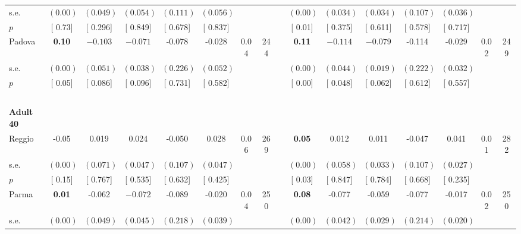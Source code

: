 \begin{longtable}{L{8em} c c c c c c c p{1em} c c c c c c c}
\quad \quad \quad \quad s.e.& $ (     0.00)$ & $ (    0.049)$ & $ (    0.054)$ & $ (    0.111)$ & $ (    0.056)$ & & & & $ (     0.00)$ & $ (    0.034)$ & $ (    0.034)$ & $ (    0.107)$ & $ (    0.036)$ & &  \\*
\quad \quad \quad \quad $ p$ & [     0.73] & [    0.296] & [    0.849] & [    0.678] & [    0.837] & & & & [     0.01] & [    0.375] & [    0.611] & [    0.578] & [    0.717] & &  \\[1em]
\quad \quad \quad Padova& \textbf{     0.10} & $ \mathbf{   -0.103}$ & $ \mathbf{   -0.071}$ &    -0.078 &    -0.028 &      0.04 &       244 & & \textbf{     0.11} & $ \mathbf{   -0.114}$ & $ \mathbf{   -0.079}$ &    -0.114 &    -0.029 &      0.02 &       249  \\*
\quad \quad \quad \quad s.e.& $ (     0.00)$ & $ (    0.051)$ & $ (    0.038)$ & $ (    0.226)$ & $ (    0.052)$ & & & & $ (     0.00)$ & $ (    0.044)$ & $ (    0.019)$ & $ (    0.222)$ & $ (    0.032)$ & &  \\*
\quad \quad \quad \quad $ p$ & [     0.05] & [    0.086] & [    0.096] & [    0.731] & [    0.582] & & & & [     0.00] & [    0.048] & [    0.062] & [    0.612] & [    0.557] & &  \\[1em]
~\\[1em]
\quad \quad \textbf{Adult 40} & & & & & & & & & & & & & & & \\* 
\quad \quad \quad Reggio& -0.05 &     0.019 &     0.024 &    -0.050 &     0.028 &      0.06 &       269 & & \textbf{     0.05} &     0.012 &     0.011 &    -0.047 &     0.041 &      0.01 &       282  \\*
\quad \quad \quad \quad s.e.& $ (     0.00)$ & $ (    0.071)$ & $ (    0.047)$ & $ (    0.107)$ & $ (    0.047)$ & & & & $ (     0.00)$ & $ (    0.058)$ & $ (    0.033)$ & $ (    0.107)$ & $ (    0.027)$ & &  \\*
\quad \quad \quad \quad $ p$ & [     0.15] & [    0.767] & [    0.535] & [    0.632] & [    0.425] & & & & [     0.03] & [    0.847] & [    0.784] & [    0.668] & [    0.235] & &  \\[1em]
\quad \quad \quad Parma& \textbf{     0.01} &    -0.062 & $ \mathbf{   -0.072}$ &    -0.089 &    -0.020 &      0.04 &       250 & & \textbf{     0.08} &    -0.077 &    -0.059 &    -0.077 &    -0.017 &      0.02 &       250  \\*
\quad \quad \quad \quad s.e.& $ (     0.00)$ & $ (    0.049)$ & $ (    0.045)$ & $ (    0.218)$ & $ (    0.039)$ & & & & $ (     0.00)$ & $ (    0.042)$ & $ (    0.029)$ & $ (    0.214)$ & $ (    0.020)$ & &  \\*

\end{longtable}
